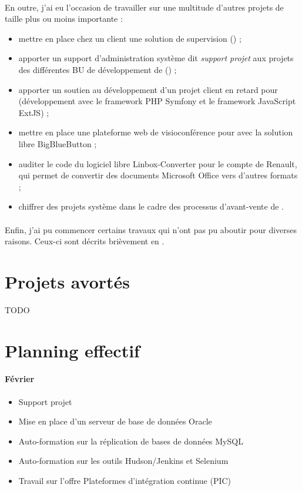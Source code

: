 \paragraph{}
En outre, j'ai eu l'occasion de travailler sur une multitude d'autres projets de taille plus ou moins importante :

\begin{itemize}
	\item mettre en place chez un client une solution de supervision \acentreon{} () ;
	\item apporter un support d'administration système dit \emph{support projet} aux projets des différentes BU de développement de \asmile{} () ;
	\item apporter un soutien au développement d'un projet client en retard pour \abt{} (développement avec le framework PHP Symfony et le framework JavaScript ExtJS) ;
	\item mettre en place une plateforme web de visioconférence pour \asmile{} avec la solution libre BigBlueButton ;
	\item auditer le code du logiciel libre Linbox-Converter pour le compte de Renault, qui permet de convertir des documents Microsoft Office vers d'autres formats ;
	\item chiffrer des projets système dans le cadre des processus d'avant-vente de \asmile.
\end{itemize}

\paragraph{}
Enfin, j'ai pu commencer certains travaux qui n'ont pas pu aboutir pour diverses raisons.
Ceux-ci sont décrits brièvement en .



\section{Projets avortés}
\label{section:avortes}

TODO



\section{Planning effectif}

\paragraph{Février}
\begin{itemize}
	\item Support projet
	\item Mise en place d'un serveur de base de données Oracle
	\item Auto-formation sur la réplication de bases de données MySQL
	\item Auto-formation sur les outils Hudson/Jenkins et Selenium
	\item Travail sur l'offre \og Plateformes d'intégration continue \fg{} (PIC)
\end{itemize}

